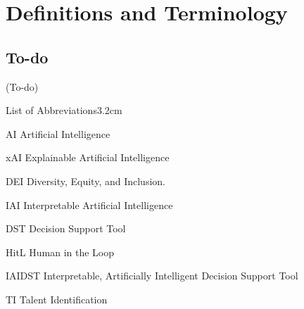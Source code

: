 

\chapter{\label{app:terminology}Definitions and Terminology}

\minitoc

\section{To-do}
(To-do)

\begin{mclistof}{List of Abbreviations}{3.2cm}
    \item[AI] Artificial Intelligence
    \item[xAI] Explainable Artificial Intelligence
    \item[DEI] Diversity, Equity, and Inclusion.
    \item[IAI] Interpretable Artificial Intelligence
    \item[DST] Decision Support Tool
    \item[HitL] Human in the Loop 
    \item[IAIDST] Interpretable, Artificially Intelligent Decision Support Tool
    \item[TI] Talent Identification 
\end{mclistof}